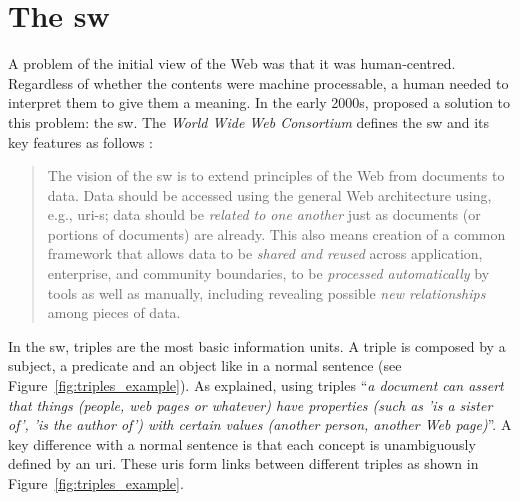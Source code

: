 \section{The \acl{sw}}
\label{sec:soa_sw}

A problem of the initial view of the Web was that it was human-centred.
Regardless of whether the contents were machine processable, a human needed to interpret them to give them a meaning.
In the early 2000s, \citet{berners-lee_semantic_2001} proposed a solution to this problem: the \acf{sw}.
The \emph{World Wide Web Consortium} defines the \ac{sw} and its key features as follows \citep{semanticWeb-FAQ}:
\begin{quote}
The vision of the \acl{sw} is to extend principles of the Web from documents to data.
Data should be accessed using the general Web architecture using, e.g., \acs{uri}-s;
data should be \emph{related to one another} just as documents (or portions of documents) are already.
This also means creation of a common framework that allows data to be \emph{shared and reused} across application, enterprise, and community boundaries,
to be \emph{processed automatically} by tools as well as manually, including revealing possible \emph{new relationships} among pieces of data.
\end{quote}


In the \ac{sw}, triples are the most basic information units.
A triple is composed by a subject, a predicate and an object like in a normal sentence (see Figure~\ref{fig:triples_example}).
As \citeauthor{berners-lee_semantic_2001} explained, using triples ``\emph{a document can assert that things (people, web pages or whatever) have properties (such as 'is a sister of', 'is the author of') with certain values (another person, another Web page)}''.
A key difference with a normal sentence is that each concept is unambiguously defined by an \acs{uri}.
These \acsp{uri} form links between different triples as shown in Figure~\ref{fig:triples_example}.


